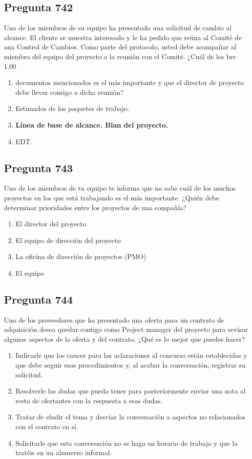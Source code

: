 \documentclass[11pt,a4paper]{article}
\begin{document}
\subsection*{Pregunta 742}
Uno de los miembros de su equipo ha presentado una solicitud de cambio al alcance. El cliente se muestra interesado y le ha pedido que reúna al Comité de ana Control de Cambios. Como parte del protocolo, usted debe acompañar al miembro del equipo del proyecto a la reunión con el Comité. ¿Cuál de los bre 1.00

\begin{enumerate}[label=\alph*)]
  \item documentos mencionados es el más importante y que el director de proyecto debe llevar consigo a dicha reunión?
  \item Estimados de los paquetes de trabajo.
  \item \textbf{Línea de base de alcance. Blan del proyecto.}
  \item EDT.
\end{enumerate}

\subsection*{Pregunta 743}
Uno de los miembros de tu equipo te informa que no sabe cuál de los muchos proyectos en los que está trabajando es el más importante. ¿Quién debe determinar prioridades entre los proyectos de una compañía?

\begin{enumerate}[label=\alph*)]
  \item El director del proyecto
  \item El equipo de dirección del proyecto
  \item La oficina de dirección de proyectos (PMO)
  \item El equipo
\end{enumerate}

\subsection*{Pregunta 744}
Uno de los proveedores que ha presentado una oferta para un contrato de adquisición desea quedar contigo como Project manager del proyecto para revisar algunos aspectos de la oferta y del contrato. ¿Qué es lo mejor que puedes hacer?

\begin{enumerate}[label=\alph*)]
  \item Indicarle que los cauces para las aclaraciones al concurso están establecidas y que debe seguir esos procedimientos y, al acabar la conversación, registrar su solicitud.
  \item Resolverle las dudas que pueda tener para posteriormente enviar una nota al resto de ofertantes con la respuesta a esas dudas.
  \item Tratar de eludir el tema y desviar la conversación a aspectos no relacionados con el contrato en sí.
  \item Solicitarle que esta conversación no se haga en horario de trabajo y que la tratéis en un almuerzo informal.
\end{enumerate}
\end{document}

